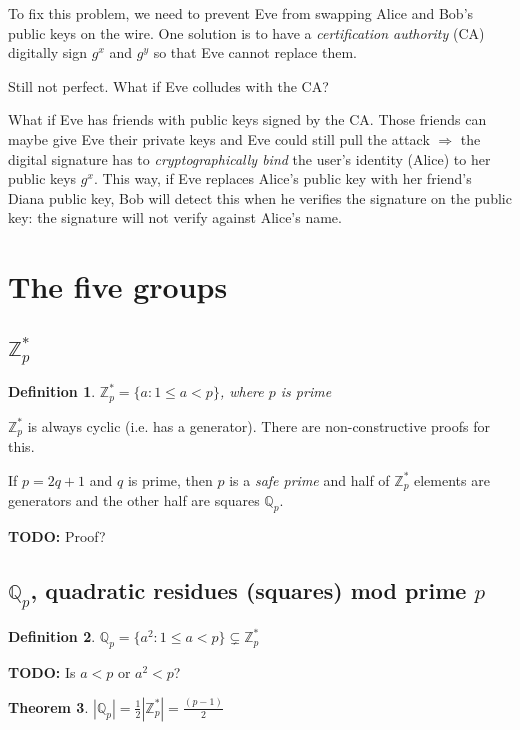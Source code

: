\documentclass[12pt]{article}
\newtheorem{thm}{Theorem}[section]
\newtheorem{definition}[thm]{Definition}
\newcommand{\Zp}{\mathbb{Z}^{\ast}_p}
\newcommand{\Qp}{\mathbb{Q}_p}
\newcommand{\todo}{\textbf{TODO:} }
\newcommand{\sz}[1]{\left|#1\right|}
\begin{document}
To fix this problem, we need to prevent Eve from swapping Alice and Bob's public
keys on the wire. One solution is to have a \emph{certification authority} (CA)
digitally sign $g^x$ and $g^y$ so that Eve cannot replace them.

\begin{note}
Still not perfect. What if Eve colludes with the CA?
\end{note}

\begin{note}
What if Eve has friends with public keys signed by the CA. Those friends can maybe give Eve their private keys and Eve could still pull the attack $\Rightarrow$ the
digital signature has to \emph{cryptographically bind} the user's identity (Alice)
to her public keys $g^x$. This way, if Eve replaces Alice's public key with
her friend's Diana public key, Bob will detect this when he verifies the signature
on the public key: the signature will not verify against Alice's name.
\end{note}

\section{The five groups}

\subsection{$\Zp$}
\begin{definition}
$\Zp = \{ a : 1 \le a < p\}$, where $p$ is prime
\end{definition}

$\Zp$ is always cyclic (i.e. has a generator). There are non-constructive proofs
for this.

If $p = 2q + 1$ and $q$ is prime, then $p$ is a \emph{safe prime} and half of
$\Zp$ elements are generators and the other half are squares $\Qp$.

\todo Proof?

\subsection{$\Qp$, quadratic residues (squares) mod prime $p$}
\begin{definition}
$\Qp = \{a^2 : 1 \le a < p\} \subsetneq \Zp$
\end{definition}

\todo Is $a < p$ or $a^2 < p$?

\begin{thm}
$|\Qp| = \frac{1}{2}\sz{\Zp} = \frac{(p-1)}{2}$
\end{thm}
\end{document}
